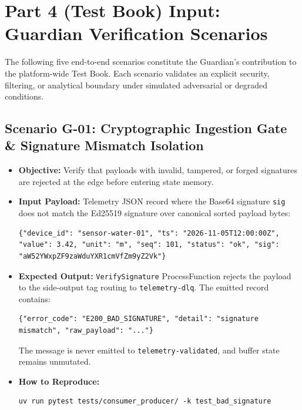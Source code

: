 \documentclass[11pt,a4paper]{article}
\begin{document}
\section{Part 4 (Test Book) Input: Guardian Verification Scenarios}

The following five end-to-end scenarios constitute the Guardian's contribution to the platform-wide Test Book. Each scenario validates an explicit security, filtering, or analytical boundary under simulated adversarial or degraded conditions.

\subsection{Scenario G-01: Cryptographic Ingestion Gate \& Signature Mismatch Isolation}
\begin{itemize}[leftmargin=*,itemsep=1.5pt]
  \item \textbf{Objective:} Verify that payloads with invalid, tampered, or forged signatures are rejected at the edge before entering state memory.
  \item \textbf{Input Payload:} Telemetry JSON record where the Base64 signature \texttt{sig} does not match the Ed25519 signature over canonical sorted payload bytes:
\begin{lstlisting}
{"device_id": "sensor-water-01", "ts": "2026-11-05T12:00:00Z", "value": 3.42, "unit": "m", "seq": 101, "status": "ok", "sig": "aW52YWxpZF9zaWduYXR1cmVfZm9yZ2Vk"}
\end{lstlisting}
  \item \textbf{Expected Output:} \texttt{VerifySignature} ProcessFunction rejects the payload to the side-output tag routing to \texttt{telemetry-dlq}. The emitted record contains:
\begin{lstlisting}
{"error_code": "E200_BAD_SIGNATURE", "detail": "signature mismatch", "raw_payload": "..."}
\end{lstlisting}
  The message is never emitted to \texttt{telemetry-validated}, and buffer state remains unmutated.
  \item \textbf{How to Reproduce:}
\begin{lstlisting}
uv run pytest tests/consumer_producer/ -k test_bad_signature
\end{lstlisting}
\end{itemize}
\end{document}
